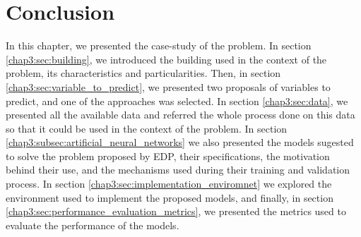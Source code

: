 \section{Conclusion}\label{chap3:sec:conclusion}

In this chapter, we presented the case-study of the problem. In section \ref{chap3:sec:building}, we introduced the building used in the context of the problem, its characteristics and particularities. Then, in section \ref{chap3:sec:variable_to_predict}, we presented two proposals of variables to predict, and one of the approaches was selected. In section \ref{chap3:sec:data}, we presented all the available data and referred the whole process done on this data so that it could be used in the context of the problem. In section \ref{chap3:subsec:artificial_neural_networks} we also presented the models sugested to solve the problem proposed by \ac{EDP}, their specifications, the motivation behind their use, and the mechanisms used during their training and validation process. In section \ref{chap3:sec:implementation_enviromnet} we explored the environment used to implement the proposed models, and finally, in section \ref{chap3:sec:performance_evaluation_metrics}, we presented the metrics used to evaluate the performance of the models.